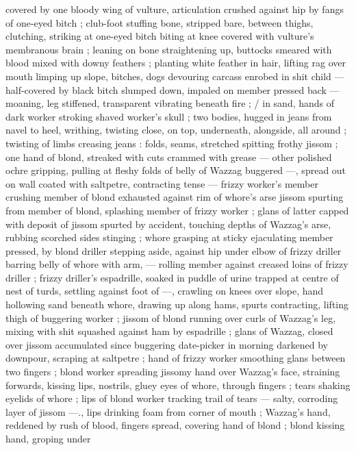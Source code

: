 covered by one bloody wing of vulture, articulation crushed against 
hip by fangs of one-eyed bitch ; club-foot stuffing bone, stripped 
bare, between thighs, clutching, striking at one-eyed bitch biting at 
knee covered with vulture's membranous brain ; leaning on bone 
straightening up, buttocks smeared with blood mixed with downy 
feathers ; planting white feather in hair, lifting rag over mouth 
limping up slope, bitches, dogs devouring carcass enrobed in shit 
child --- half-covered by black bitch slumped down, impaled on 
member pressed back --- moaning, leg stiffened, transparent 
vibrating beneath fire ; {\slash} in sand, hands of dark worker stroking 
shaved worker's skull ; two bodies, hugged in jeans from navel to 
heel, writhing, twisting close, on top, underneath, alongside, all 
around ; twisting of limbs creasing jeans : folds, seams, stretched 
spitting frothy jissom ; one hand of blond, streaked with cuts 
crammed with grease --- other polished ochre gripping, pulling at 
fleshy folds of belly of Wazzag buggered ---, spread out on wall 
coated with saltpetre, contracting tense --- frizzy worker's member 
crushing member of blond exhausted against rim of whore's arse 
jissom spurting from member of blond, splashing member of frizzy 
worker ; glans of latter capped with deposit of jissom spurted by 
accident, touching depths of Wazzag's arse, rubbing scorched sides 
stinging ; whore grasping at sticky ejaculating member pressed, by 
blond driller stepping aside, against hip under elbow of frizzy driller 
barring belly of whore with arm, --- rolling member against creased 
loins of frizzy driller ; frizzy driller's espadrille, soaked in puddle of 
urine trapped at centre of nest of turds, settling against foot of 
---, crawling on knees over slope, hand hollowing sand beneath 
whore, drawing up along hams, spurts contracting, lifting thigh of 
buggering worker ; jissom of blond running over curls of Wazzag's 
leg, mixing with shit squashed against ham by espadrille ; glans of 
Wazzag, closed over jissom accumulated since buggering date-picker 
in morning darkened by downpour, scraping at saltpetre ; hand of 
frizzy worker smoothing glans between two fingers ; blond worker 
spreading jissomy hand over Wazzag's face, straining forwards, 
kissing lips, nostrils, gluey eyes of whore, through fingers ; tears 
shaking eyelids of whore ; lips of blond worker tracking trail of tears 
--- salty, corroding layer of jissom ---., lips drinking foam from corner 
of mouth ; Wazzag's hand, reddened by rush of blood, fingers 
spread, covering hand of blond ; blond kissing hand, groping under 
